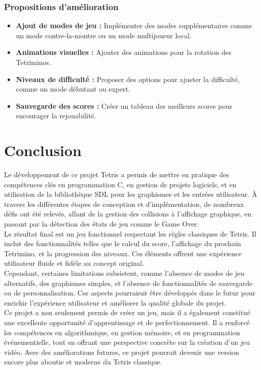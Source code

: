 \documentclass[12pt,a4paper]{report}
\begin{document}
\subsection{Propositions d'amélioration}
\begin{itemize}
    \item \textbf{Ajout de modes de jeu :} Implémenter des modes supplémentaires comme un mode contre-la-montre ou un mode multijoueur local.
    \item \textbf{Animations visuelles :} Ajouter des animations pour la rotation des Tetriminos.
    \item \textbf{Niveaux de difficulté :} Proposer des options pour ajuster la difficulté, comme un mode débutant ou expert.
    \item \textbf{Sauvegarde des scores :} Créer un tableau des meilleurs scores pour encourager la rejouabilité.
\end{itemize}


\newpage
\chapter{Conclusion}

Le développement de ce projet Tetris a permis de mettre en pratique des compétences clés en programmation C, en gestion de projets logiciels, et en utilisation de la bibliothèque SDL pour les graphismes et les entrées utilisateur. À travers les différentes étapes de conception et d'implémentation, de nombreux défis ont été relevés, allant de la gestion des collisions à l'affichage graphique, en passant par la détection des états de jeu comme le Game Over.
\\

Le résultat final est un jeu fonctionnel respectant les règles classiques de Tetris. Il inclut des fonctionnalités telles que le calcul du score, l'affichage du prochain Tetrimino, et la progression des niveaux. Ces éléments offrent une expérience utilisateur fluide et fidèle au concept original.
\\

Cependant, certaines limitations subsistent, comme l'absence de modes de jeu alternatifs, des graphismes simples, et l'absence de fonctionnalités de sauvegarde ou de personnalisation. Ces aspects pourraient être développés dans le futur pour enrichir l'expérience utilisateur et améliorer la qualité globale du projet.
\\

Ce projet a non seulement permis de créer un jeu, mais il a également constitué une excellente opportunité d'apprentissage et de perfectionnement. Il a renforcé les compétences en algorithmique, en gestion mémoire, et en programmation événementielle, tout en offrant une perspective concrète sur la création d’un jeu vidéo. Avec des améliorations futures, ce projet pourrait devenir une version encore plus aboutie et moderne du Tetris classique.
\\
\end{document}
